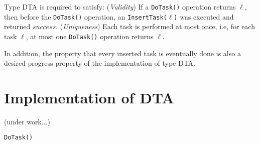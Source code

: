 Type DTA is required to satisfy: (\emph{Validity}) If a \texttt{DoTask()} operation returns $\ell$, then before the
\texttt{DoTask()} operation, an \texttt{InsertTask(}$\ell$\texttt{)} was executed and returned $success$.
(\emph{Uniqueness}) Each task is performed at most once, i.e, for each task $\ell$, at most one \texttt{DoTask()}
operation returns $\ell$.

In addition, the property that every inserted task is eventually done is also a desired progress property
of the implementation of type DTA.

\section*{Implementation of DTA}
(under work...)

\begin{algorithm}
\caption{\texttt{DoTask()}}
\end{algorithm}

